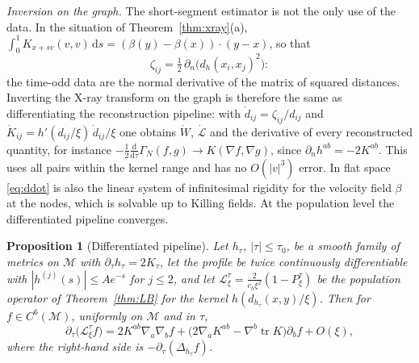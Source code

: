 \documentclass[11pt,a4paper]{article}
\theoremstyle{stmt}
\newtheorem{proposition}[theorem]{Proposition}
\theoremstyle{defn}
\theoremstyle{rmk}
\numberwithin{equation}{section}
\newcommand{\M}{\mathcal{M}}
\newcommand{\Lc}{\mathcal{L}}
\newcommand{\dd}{\mathrm{d}}
\begin{document}
\emph{Inversion on the graph.} The short-segment estimator is not the only use of the data. In the situation of Theorem~\ref{thm:xray}(a), $\int_0^1K_{x+sv}(v,v)\,\dd s=(\beta(y)-\beta(x))\cdot(y-x)$, so that
\begin{equation}\label{eq:ddot}
\zeta_{ij}=\tfrac12\,\partial_n\big(d_h(x_i,x_j)^2\big):
\end{equation}
the time-odd data are the normal derivative of the matrix of squared distances. Inverting the X-ray transform on the graph is therefore the same as differentiating the reconstruction pipeline: with $\dot d_{ij}=\zeta_{ij}/d_{ij}$ and $\dot K_{ij}=h'(d_{ij}/\xi)\,\dot d_{ij}/\xi$ one obtains $\dot W$, $\dot{\Lc}$ and the derivative of every reconstructed quantity, for instance $-\tfrac12\tfrac{\dd}{\dd\tau}\Gamma_N(f,g)\to K(\nabla f,\nabla g)$, since $\partial_nh^{ab}=-2K^{ab}$. This uses all pairs within the kernel range and has no $O(|v|^3)$ error. In flat space \eqref{eq:ddot} is also the linear system of infinitesimal rigidity for the velocity field $\beta$ at the nodes, which is solvable up to Killing fields. At the population level the differentiated pipeline converges.

\begin{proposition}[Differentiated pipeline]\label{prop:dotL}
Let $h_\tau$, $|\tau|\le\tau_0$, be a smooth family of metrics on $\M$ with $\partial_\tau h_\tau=2K_\tau$, let the profile be twice continuously differentiable with $|h^{(j)}(s)|\le Ae^{-s}$ for $j\le2$, and let $\Lc^\tau_\xi=\tfrac{2}{c_h\xi^2}(1-P^\tau_\xi)$ be the population operator of Theorem~\ref{thm:LB} for the kernel $h(d_{h_\tau}(x,y)/\xi)$. Then for $f\in C^6(\M)$, uniformly on $\M$ and in $\tau$,
\begin{equation}
\partial_\tau\big(\Lc^\tau_\xi f\big)=2K^{ab}\nabla_a\nabla_bf+\big(2\nabla_aK^{ab}-\nabla^b\operatorname{tr}K\big)\partial_bf+O(\xi),
\end{equation}
where the right-hand side is $-\partial_\tau(\Delta_{h_\tau}f)$.
\end{proposition}
\end{document}
